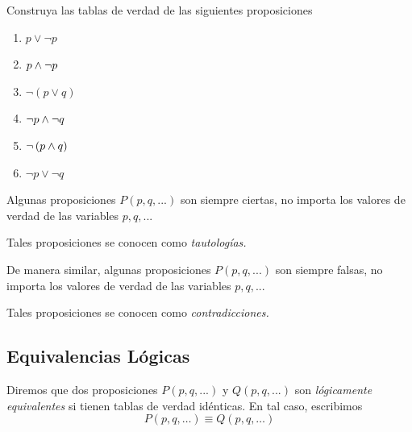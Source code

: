 
\begin{resuelto} Construya las tablas de verdad de las siguientes proposiciones
\begin{enumerate}
 \item $p\vee \neg p$
 \item $p\wedge \neg p$
 \item $\neg\left( p \vee q \right)$
 \item $\neg p \wedge \neg q$
 \item $\neg\left( p \wedge q \right)$
 \item $\neg p \vee \neg q$
\end{enumerate}


\end{resuelto}


 Algunas proposiciones $P(p,q,...)$ son siempre ciertas, no importa los valores de verdad de las variables $p,q,...$


 Tales proposiciones se conocen como \emph{tautologías.}



 De manera similar, algunas proposiciones $P(p,q,...)$ son siempre falsas, no importa los valores de verdad de las variables $p,q,...$


 Tales proposiciones se conocen como \emph{contradicciones.}






\subsection{Equivalencias Lógicas}


 Diremos que dos proposiciones $P(p,q,...)$ y $Q(p,q,...)$ son \emph{lógicamente equivalentes} si tienen tablas de verdad idénticas. En tal caso, escribimos $$P(p,q,\dots)\equiv Q(p,q,\dots)$$



